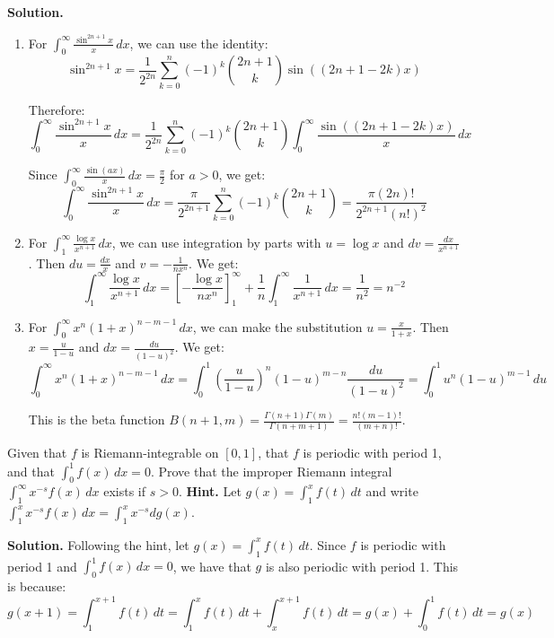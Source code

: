 \noindent\textbf{Solution.}
\begin{enumerate}[label=(\alph*)]
    \item For $\int_{0}^{\infty} \frac{\sin^{2n+1} x}{x} \, dx$, we can use the identity:
    \[\sin^{2n+1} x = \frac{1}{2^{2n}} \sum_{k=0}^{n} (-1)^k \binom{2n+1}{k} \sin((2n+1-2k)x)\]
    
    Therefore:
    \[\int_{0}^{\infty} \frac{\sin^{2n+1} x}{x} \, dx = \frac{1}{2^{2n}} \sum_{k=0}^{n} (-1)^k \binom{2n+1}{k} \int_{0}^{\infty} \frac{\sin((2n+1-2k)x)}{x} \, dx\]
    
    Since $\int_{0}^{\infty} \frac{\sin(ax)}{x} \, dx = \frac{\pi}{2}$ for $a > 0$, we get:
    \[\int_{0}^{\infty} \frac{\sin^{2n+1} x}{x} \, dx = \frac{\pi}{2^{2n+1}} \sum_{k=0}^{n} (-1)^k \binom{2n+1}{k} = \frac{\pi(2n)!}{2^{2n+1}(n!)^2}\]
    
    \item For $\int_{1}^{\infty} \frac{\log x}{x^{n+1}} \, dx$, we can use integration by parts with $u = \log x$ and $dv = \frac{dx}{x^{n+1}}$. Then $du = \frac{dx}{x}$ and $v = -\frac{1}{nx^n}$. We get:
    \[\int_{1}^{\infty} \frac{\log x}{x^{n+1}} \, dx = \left[-\frac{\log x}{nx^n}\right]_{1}^{\infty} + \frac{1}{n} \int_{1}^{\infty} \frac{1}{x^{n+1}} \, dx = \frac{1}{n^2} = n^{-2}\]
    
    \item For $\int_{0}^{\infty} x^n (1 + x)^{n-m-1} \, dx$, we can make the substitution $u = \frac{x}{1+x}$. Then $x = \frac{u}{1-u}$ and $dx = \frac{du}{(1-u)^2}$. We get:
    \[\int_{0}^{\infty} x^n (1 + x)^{n-m-1} \, dx = \int_{0}^{1} \left(\frac{u}{1-u}\right)^n (1-u)^{m-n} \frac{du}{(1-u)^2} = \int_{0}^{1} u^n (1-u)^{m-1} \, du\]
    
    This is the beta function $B(n+1, m) = \frac{\Gamma(n+1)\Gamma(m)}{\Gamma(n+m+1)} = \frac{n!(m-1)!}{(m+n)!}$.
\end{enumerate}

\begin{problembox}
Given that $f$ is Riemann-integrable on $[0, 1]$, that $f$ is periodic with period 1, and that $\int_{0}^{1} f(x) \, dx = 0$. Prove that the improper Riemann integral $\int_{1}^{\infty} x^{-s} f(x) \, dx$ exists if $s > 0$. \textbf{Hint.} Let $g(x) = \int_{1}^{x} f(t) \, dt$ and write $\int_{1}^{x} x^{-s} f(x) \, dx = \int_{1}^{x} x^{-s} dg(x)$.
\end{problembox}

\noindent\textbf{Solution.}
Following the hint, let $g(x) = \int_{1}^{x} f(t) \, dt$. Since $f$ is periodic with period 1 and $\int_{0}^{1} f(x) \, dx = 0$, we have that $g$ is also periodic with period 1. This is because:
\[g(x+1) = \int_{1}^{x+1} f(t) \, dt = \int_{1}^{x} f(t) \, dt + \int_{x}^{x+1} f(t) \, dt = g(x) + \int_{0}^{1} f(t) \, dt = g(x)\]

